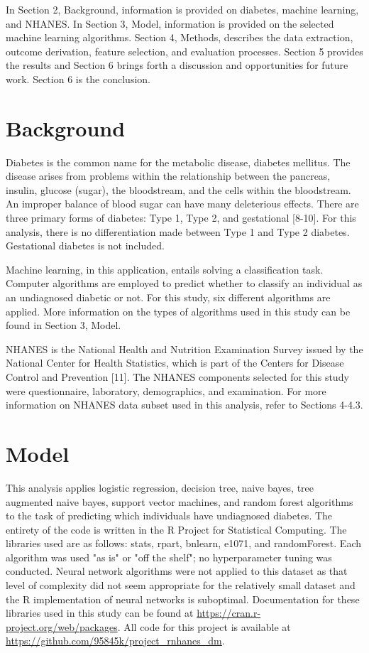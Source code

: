 \documentclass[twoside,11pt]{article}
\begin{document}
In Section 2, Background, information is provided on diabetes, machine learning, and NHANES. In Section 3, Model, information is provided on the selected machine learning algorithms. Section 4, Methods, describes the data extraction, outcome derivation, feature selection, and evaluation processes. Section 5 provides the results and Section 6 brings forth a discussion and opportunities for future work. Section 6 is the conclusion. 

\section{Background} \label{background}
Diabetes is the common name for the metabolic disease, diabetes mellitus. The disease arises from problems within the relationship between the pancreas, insulin, glucose (sugar), the bloodstream, and the cells within the bloodstream. An improper balance of blood sugar can have many deleterious effects. There are three primary forms of diabetes: Type 1, Type 2, and gestational [8-10]. For this analysis, there is no differentiation made between Type 1 and Type 2 diabetes. Gestational diabetes is not included. 

Machine learning, in this application, entails solving a classification task. Computer algorithms are employed to predict whether to classify an individual as an undiagnosed diabetic or not. For this study, six different algorithms are applied. More information on the types of algorithms used in this study can be found in Section 3, Model. 

NHANES is the National Health and Nutrition Examination Survey issued by the National Center for Health Statistics, which is part of the Centers for Disease Control and Prevention [11]. The NHANES components selected for this study were questionnaire, laboratory, demographics, and examination. For more information on NHANES data subset used in this analysis, refer to Sections 4-4.3. 

\section{Model} \label{model}
This analysis applies logistic regression, decision tree, naive bayes, tree augmented naive bayes, support vector machines, and random forest algorithms to the task of predicting which individuals have undiagnosed diabetes. The entirety of the code is written in the R Project for Statistical Computing. The libraries used are as follows: stats, rpart, bnlearn, e1071, and randomForest. Each algorithm was used "as is" or "off the shelf"; no hyperparameter tuning was conducted. Neural network algorithms were not applied to this dataset as that level of complexity did not seem appropriate for the relatively small dataset and the R implementation of neural networks is suboptimal. Documentation for these libraries used in this study can be found at \url{https://cran.r-project.org/web/packages}. All code for this project is available at \url{https://github.com/95845k/project_rnhanes_dm}.
\end{document}
